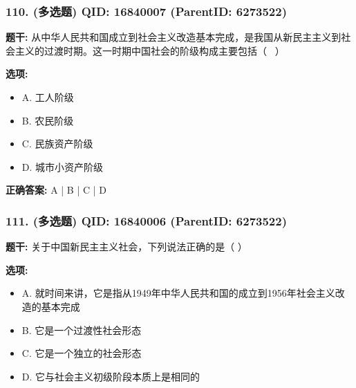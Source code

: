 \documentclass[12pt,UTF8]{ctexart}
\begin{document}
\vspace{0.3em}\hrulefill\vspace{0.7em}

\subsubsection*{110. (多选题) \small QID: 16840007 (ParentID: 6273522)}

\textbf{题干:}
从中华人民共和国成立到社会主义改造基本完成，是我国从新民主主义到社会主义的过渡时期。这一时期中国社会的阶级构成主要包括（  ）



\textbf{选项:}
\begin{itemize}[leftmargin=*]

  \item A. 工人阶级

  \item B. 农民阶级

  \item C. 民族资产阶级

  \item D. 城市小资产阶级

\end{itemize}

\textbf{正确答案:}
A | B | C | D

\vspace{0.3em}\hrulefill\vspace{0.7em}

\subsubsection*{111. (多选题) \small QID: 16840006 (ParentID: 6273522)}

\textbf{题干:}
关于中国新民主主义社会，下列说法正确的是（ ）



\textbf{选项:}
\begin{itemize}[leftmargin=*]

  \item A. 就时间来讲，它是指从1949年中华人民共和国的成立到1956年社会主义改造的基本完成

  \item B. 它是一个过渡性社会形态

  \item C. 它是一个独立的社会形态

  \item D. 它与社会主义初级阶段本质上是相同的

\end{itemize}
\end{document}
